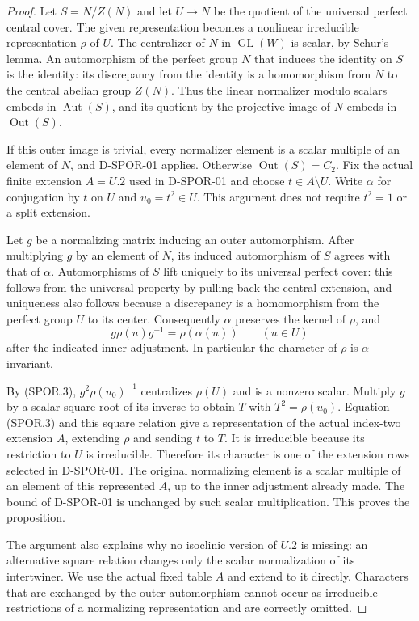 \begin{proof}
Let $S=N/Z(N)$ and let $U\to N$ be the quotient of the universal
perfect central cover.  The given representation becomes a
nonlinear irreducible representation $\rho$ of $U$.
The centralizer of $N$ in $\operatorname{GL}(W)$ is scalar, by
Schur's lemma.  An automorphism of the perfect group $N$ that
induces the identity on $S$ is the identity: its discrepancy from
the identity is a homomorphism from $N$ to the central abelian
group $Z(N)$.  Thus the linear normalizer modulo scalars embeds
in $\operatorname{Aut}(S)$, and its quotient by the projective
image of $N$ embeds in $\operatorname{Out}(S)$.

If this outer image is trivial, every normalizer element is a
scalar multiple of an element of $N$, and D-SPOR-01 applies.
Otherwise $\operatorname{Out}(S)=C_2$.  Fix the actual finite
extension $A=U.2$ used in D-SPOR-01 and choose $t\in A\setminus U$.
Write $\alpha$ for conjugation by $t$ on $U$ and $u_0=t^2\in U$.
This argument does not require $t^2=1$ or a split extension.

Let $g$ be a normalizing matrix inducing an outer automorphism.
After multiplying $g$ by an element of $N$, its induced
automorphism of $S$ agrees with that of $\alpha$.  Automorphisms
of $S$ lift uniquely to its universal perfect cover: this follows
from the universal property by pulling back the central extension,
and uniqueness also follows because a discrepancy is a homomorphism
from the perfect group $U$ to its center.  Consequently $\alpha$
preserves the kernel of $\rho$, and
\[
             g\rho(u)g^{-1}=\rho(\alpha(u))\qquad(u\in U)
                                                               \tag{SPOR.3}
\]
after the indicated inner adjustment.  In particular the character
of $\rho$ is $\alpha$-invariant.

By (SPOR.3), $g^2\rho(u_0)^{-1}$ centralizes $\rho(U)$ and is
a nonzero scalar.  Multiply $g$ by a scalar square root of its
inverse to obtain $T$ with $T^2=\rho(u_0)$.  Equation (SPOR.3)
and this square relation give a representation of the actual
index-two extension $A$, extending $\rho$ and sending $t$ to $T$.
It is irreducible because its restriction to $U$ is irreducible.
Therefore its character is one of the extension rows selected in
D-SPOR-01.  The original normalizing element is a scalar multiple
of an element of this represented $A$, up to the inner adjustment
already made.  The bound of D-SPOR-01 is unchanged by such scalar
multiplication.  This proves the proposition.

The argument also explains why no isoclinic version of $U.2$ is
missing: an alternative square relation changes only the scalar
normalization of its intertwiner.  We use the actual fixed table
$A$ and extend to it directly.  Characters that are exchanged by
the outer automorphism cannot occur as irreducible restrictions
of a normalizing representation and are correctly omitted.
\end{proof}


